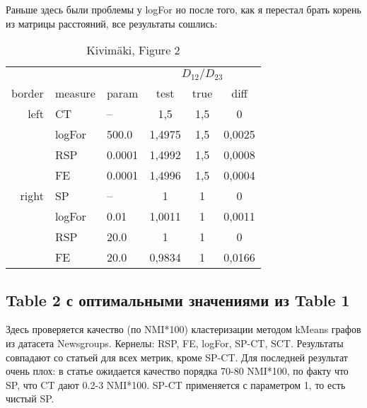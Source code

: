 \documentclass{article}
\begin{document}
Раньше здесь были проблемы у logFor но после того, как я перестал брать корень из матрицы расстояний, все результаты сошлись:

\begin{table}[H]
\centering
\caption{Kivim{\"a}ki, Figure 2}
\label{my-label}
\begin{tabular}{rll|cc|c}
       &         &        & \multicolumn{3}{c}{$D_{12} / D_{23}$} \\
border & measure & param  & test   & true & diff   \\
       \hline
left   & CT      & --       & 1,5    & 1,5  & 0      \\
       & logFor  & 500.0  & 1,4975 & 1,5  & 0,0025 \\
       & RSP     & 0.0001 & 1,4992 & 1,5  & 0,0008 \\
       & FE      & 0.0001 & 1,4996 & 1,5  & 0,0004 \\
       \hline
right  & SP      & --       & 1      & 1    & 0      \\
       & logFor  & 0.01   & 1,0011 & 1    & 0,0011 \\
       & RSP     & 20.0   & 1      & 1    & 0      \\
       & FE      & 20.0   & 0,9834 & 1    & 0,0166
\end{tabular}
\end{table}

\subsection{Table 2 с оптимальными значениями из Table 1}
Здесь проверяется качество (по NMI*100) кластеризации методом kMeans графов из датасета Newsgroups. Кернелы: RSP, FE, logFor, SP-CT, SCT. Результаты совпадают со статьей для всех метрик, кроме SP-CT. Для последней результат очень плох: в статье ожидается качество порядка 70-80 NMI*100, по факту что SP, что CT дают 0.2-3 NMI*100. SP-CT применяется с параметром 1, то есть чистый SP.
\end{document}
